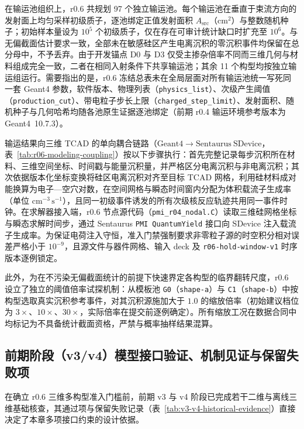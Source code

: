 在输运池组织上，r0.6 共规划 97 个独立输运池。每个输运池在垂直于束流方向的发射面上均匀采样初级质子，逐池绑定正值发射面积 $A_{\mathrm{src}}$（$\mathrm{cm}^2$）与整数随机种子；初始样本量设为 $10^5$ 个初级质子，仅在存在可审计统计缺口时扩充至 $10^6$。与无偏截面估计要求一致，全部未在敏感硅区产生电离沉积的零沉积事件均保留在总分母中，不予丢弃\cite{luo2018flux,horvitz1952sampling}。由于开发锚点 D0 与 D3 仅受主掺杂倍率不同而三维几何与材料组成完全一致，二者在相同入射条件下共享输运池；其余 11 个构型均按独立输运组运行。需要指出的是，r0.6 冻结总表未在全局层面对所有输运池统一写死同一套 Geant4 参数，软件版本、物理列表（\texttt{physics\_list}）、次级产生阈值（\texttt{production\_cut}）、带电粒子步长上限（\texttt{charged\_step\_limit}）、发射面积、随机种子与几何哈希均随各池原生证据逐池绑定（前期 r0.4 输运环境参考版本为 Geant4~10.7.3）。

输运结果向三维 TCAD 的单向耦合链路（$\mathrm{Geant4}\to\mathrm{Sentaurus\ SDevice}$，表~\ref{tab:r06-modeling-coupling}）按以下步骤执行：首先完整记录每步沉积所在材料、三维空间坐标、时间戳与能量沉积量，并严格区分电离沉积与非电离沉积；其次依据版本化坐标变换将硅区电离沉积对齐至目标 TCAD 网格，利用硅材料成对能换算为电子—空穴对数，在空间网格与瞬态时间窗内分配为体积载流子生成率（单位 $\mathrm{cm}^{-3}\,\mathrm{s}^{-1}$），且同一初级事件诱发的所有次级核反应轨迹共用同一事件时钟。在求解器接入端，r0.6 节点源代码（\texttt{pmi\_r04\_nodal.C}）读取三维硅网格坐标与瞬态求解时间步，通过 Sentaurus \texttt{PMI QuantumYield} 接口向 SDevice 注入载流子生成率。为保证电荷注入守恒，准入门禁强制要求非零粒子源的时空积分相对误差严格小于 $10^{-9}$，且源文件与器件网格、输入 deck 及 \texttt{r06-hold-window-v1} 时序版本逐例锁定。

此外，为在不污染无偏截面统计的前提下快速界定各构型的临界翻转尺度，r0.6 设立了独立的阈值倍率试探机制：从模板池 \texttt{G0}（\texttt{shape-a}）与 \texttt{C1}（\texttt{shape-b}）中按构型选取真实沉积参考事件，对其沉积源施加大于 $1.0$ 的缩放倍率（初始建议档位为 $3\times$、$10\times$、$30\times$，实际倍率在提交前逐例确定）。所有缩放工况在数据合同中均标记为不具备统计截面资格，严禁与概率抽样结果混算。



\subsection{前期阶段（v3/v4）模型接口验证、机制见证与保留失败项}
\label{subsec:ch02-v3-v4-evidence}

在确立 r0.6 三维多构型准入门槛前，前期 v3 与 v4 阶段已完成若干二维与离线三维基础核查，其通过项与保留失败记录（表~\ref{tab:v3-v4-historical-evidence}）直接决定了本章多项接口约束的设计依据。

